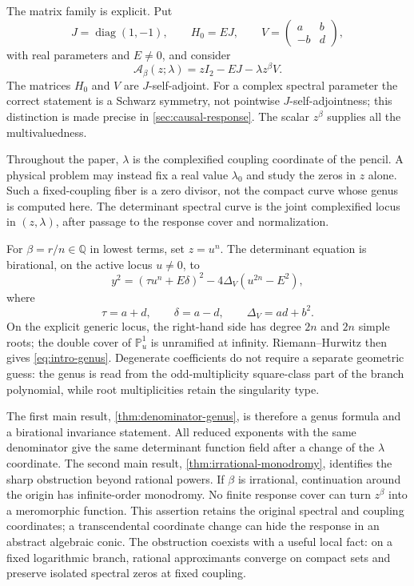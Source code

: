 \documentclass[11pt,reqno]{amsart}
\theoremstyle{remark}
\newcommand{\Q}{\mathbb Q}
\newcommand{\PP}{\mathbb P}
\newcommand{\diag}{\operatorname{diag}}
\newcommand{\cA}{\mathcal A}
\begin{document}
The matrix family is explicit.  Put
\begin{equation}\label{eq:intro-pencil}
 J=\diag(1,-1),\qquad H_0=EJ,\qquad
 V=\begin{pmatrix}a&b\\-b&d\end{pmatrix},
\end{equation}
with real parameters and $E\ne0$, and consider
\begin{equation}\label{eq:intro-general-pencil}
 \cA_\beta(z;\lambda)
 =zI_2-EJ-\lambda z^\beta V.
\end{equation}
The matrices $H_0$ and $V$ are $J$-self-adjoint.  For a complex spectral
parameter the correct statement is a Schwarz symmetry, not pointwise
$J$-self-adjointness; this distinction is made precise in
\cref{sec:causal-response}.  The scalar $z^\beta$ supplies all the
multivaluedness.

Throughout the paper, $\lambda$ is the complexified coupling coordinate of
the pencil.  A physical problem may instead fix a real value $\lambda_0$ and
study the zeros in $z$ alone.  Such a fixed-coupling fiber is a zero divisor,
not the compact curve whose genus is computed here.  The determinant spectral
curve is the joint complexified locus in $(z,\lambda)$, after passage to the
response cover and normalization.

For $\beta=r/n\in\Q$ in lowest terms, set $z=u^n$.  The determinant equation
is birational, on the active locus $u\ne0$, to
\begin{equation}\label{eq:intro-curve}
 y^2=(\tau u^n+E\delta)^2
      -4\Delta_V(u^{2n}-E^2),
\end{equation}
where
\begin{equation}\label{eq:intro-invariants}
 \tau=a+d,\qquad \delta=a-d,\qquad
 \Delta_V=ad+b^2.
\end{equation}
On the explicit generic locus, the right-hand side has degree $2n$ and
$2n$ simple roots; the double cover of $\PP^1_u$ is unramified at infinity.
Riemann--Hurwitz then gives \eqref{eq:intro-genus}.  Degenerate coefficients
do not require a separate geometric guess: the genus is read from the
odd-multiplicity square-class part of the branch polynomial, while root
multiplicities retain the singularity type.

The first main result, \cref{thm:denominator-genus}, is therefore a genus
formula and a birational invariance statement.  All reduced exponents with
the same denominator give the same determinant function field after a
change of the $\lambda$ coordinate.  The second main result,
\cref{thm:irrational-monodromy}, identifies the sharp obstruction beyond
rational powers.  If $\beta$ is irrational, continuation around the origin
has infinite-order monodromy.  No finite response cover can turn $z^\beta$
into a meromorphic function.  This assertion retains the original spectral
and coupling coordinates; a transcendental coordinate change can hide the
response in an abstract algebraic conic.  The obstruction coexists with a
useful local fact: on a fixed logarithmic branch, rational approximants
converge on compact sets and preserve isolated spectral zeros at fixed
coupling.
\end{document}
